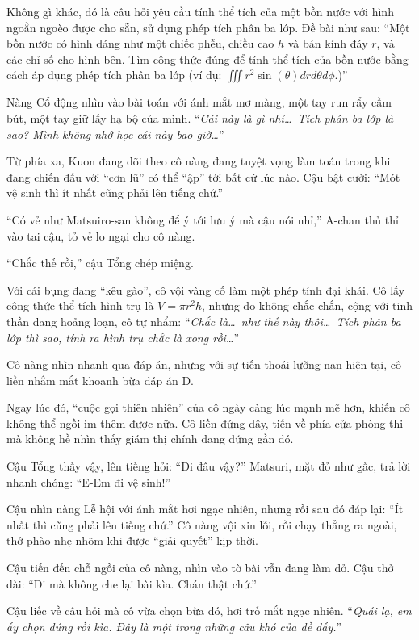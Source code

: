 \documentclass[../main.tex]{subfiles}
\begin{document}
Không gì khác, đó là câu hỏi yêu cầu tính thể tích của một bồn nước với hình ngoằn ngoèo được cho sẵn, sử dụng phép tích phân ba lớp. Đề bài như sau: ``Một bồn nước có hình dáng như một chiếc phễu, chiều cao  \(h\) và bán kính đáy \(r\), và các chỉ số cho hình bên. Tìm công thức đúng để tính thể tích của bồn nước bằng cách áp dụng phép tích phân ba lớp (ví dụ: \(\iiint r^2\sin(\theta)drd\theta d\phi\).)''

Nàng Cổ động nhìn vào bài toán với ánh mắt mơ màng, một tay run rẩy cầm bút, một tay giữ lấy hạ bộ của mình. ``\textit{Cái này là gì nhỉ\dots\ Tích phân ba lớp là sao? Mình không nhớ học cái này bao giờ\dots}''

Từ phía xa, Kuon đang dõi theo cô nàng đang tuyệt vọng làm toán trong khi đang chiến đấu với ``cơn lũ'' có thể ``ập'' tới bất cứ lúc nào. Cậu bật cười: ``Mót vệ sinh thì ít nhất cũng phải lên tiếng chứ.''

``Có vẻ như Matsuiro-san không để ý tới lưu ý mà cậu nói nhỉ,'' A-chan thủ thỉ vào tai cậu, tỏ vẻ lo ngại cho cô nàng.

``Chắc thế rồi,'' cậu Tổng chép miệng.

Với cái bụng đang ``kêu gào'', cô vội vàng cố làm một phép tính đại khái. Cô lấy công thức thể tích hình trụ là \(V = \pi r^2h\), nhưng do không chắc chắn, cộng với tinh thần đang hoảng loạn, cô tự nhẩm: ``\textit{Chắc là\dots\ như thế này thôi\dots\ Tích phân ba lớp thì sao, tính ra hình trụ chắc là xong rồi\dots}''

Cô nàng nhìn nhanh qua đáp án, nhưng với sự tiến thoái lưỡng nan hiện tại, cô liền nhắm mắt khoanh bừa đáp án D.

Ngay lúc đó, ``cuộc gọi thiên nhiên'' của cô ngày càng lúc mạnh mẽ hơn, khiến cô không thể ngồi im thêm được nữa. Cô liền đứng dậy, tiến về phía cửa phòng thi mà không hề nhìn thấy giám thị chính đang đứng gần đó.

Cậu Tổng thấy vậy, lên tiếng hỏi: ``Đi đâu vậy?'' Matsuri, mặt đỏ như gấc, trả lời nhanh chóng: ``E-Em đi vệ sinh!''

Cậu nhìn nàng Lễ hội với ánh mắt hơi ngạc nhiên, nhưng rồi sau đó đáp lại: ``Ít nhất thì cũng phải lên tiếng chứ.'' Cô nàng vội xin lỗi, rồi chạy thẳng ra ngoài, thở phào nhẹ nhõm khi được ``giải quyết'' kịp thời.

Cậu tiến đến chỗ ngồi của cô nàng, nhìn vào tờ bài vẫn đang làm dở. Cậu thở dài: ``Đi mà không che lại bài kìa. Chán thật chứ.''

Cậu liếc về câu hỏi mà cô vừa chọn bừa đó, hơi trố mắt ngạc nhiên. ``\textit{Quái lạ, em ấy chọn đúng rồi kìa. Đây là một trong những câu khó của đề đấy.}''
\end{document}
